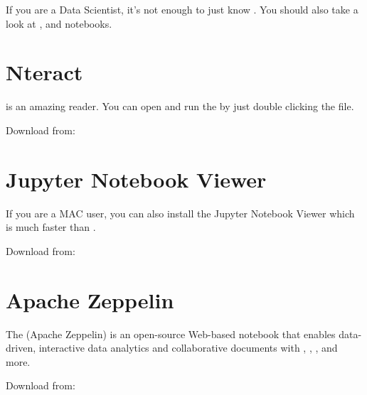 \documentclass[letterpaper,12pt,english]{sphinxmanual}
\begin{document}
If you are a Data Scientist, it’s not enough to just know . You should also take a look at ,  and  notebooks.


\section{Nteract}
\label{\detokenize{nb:nteract}}
 is an amazing  reader. You can open and run the  by just double clicking the  file.

Download from: 

\begin{figure}[htbp]
\centering

\noindent{}
\end{figure}


\section{Jupyter Notebook Viewer}
\label{\detokenize{nb:jupyter-notebook-viewer}}
If you are a MAC user, you can also install the Jupyter Notebook Viewer \textendash{} which is much faster than .

Download from: 

\begin{figure}[htbp]
\centering

\noindent{}
\end{figure}


\section{Apache Zeppelin}
\label{\detokenize{nb:apache-zeppelin}}
The  (Apache Zeppelin) is an open-source Web-based notebook that enables data-driven,
interactive data analytics and collaborative documents with , , ,  and more.

Download from: 
\end{document}
